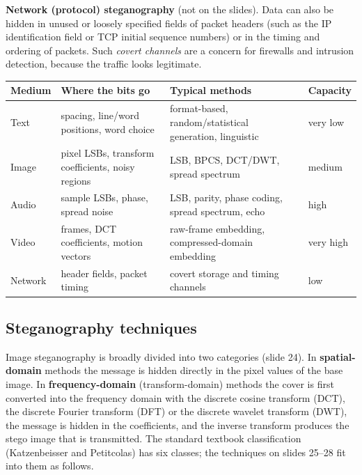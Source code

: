 \textbf{Network (protocol) steganography} (not on the slides). Data can also be hidden in unused or loosely specified fields of packet headers (such as the IP identification field or TCP initial sequence numbers) or in the timing and ordering of packets. Such \emph{covert channels} are a concern for firewalls and intrusion detection, because the traffic looks legitimate.

\begin{center}\small
\begin{tabularx}{\textwidth}{@{}l X X l@{}}
\toprule
Medium & Where the bits go & Typical methods & Capacity\\
\midrule
Text & spacing, line/word positions, word choice & format-based, random/statistical generation, linguistic & very low\\
Image & pixel LSBs, transform coefficients, noisy regions & LSB, BPCS, DCT/DWT, spread spectrum & medium\\
Audio & sample LSBs, phase, spread noise & LSB, parity, phase coding, spread spectrum, echo & high\\
Video & frames, DCT coefficients, motion vectors & raw-frame embedding, compressed-domain embedding & very high\\
Network & header fields, packet timing & covert storage and timing channels & low\\
\bottomrule
\end{tabularx}
\end{center}

\subsection{Steganography techniques \hot\new}

Image steganography is broadly divided into two categories (slide 24). In \textbf{spatial-domain} methods the message is hidden directly in the pixel values of the base image. In \textbf{frequency-domain} (transform-domain) methods the cover is first converted into the frequency domain with the discrete cosine transform (DCT), the discrete Fourier transform (DFT) or the discrete wavelet transform (DWT), the message is hidden in the coefficients, and the inverse transform produces the stego image that is transmitted. The standard textbook classification (Katzenbeisser and Petitcolas) has six classes; the techniques on slides 25--28 fit into them as follows.

